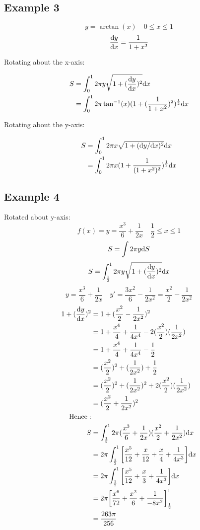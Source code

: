 \documentclass[letterpaper, 12pt]{math}
\begin{document}
\subsection*{Example 3}
\[ y = \arctan(x) \quad 0 \leq x \leq 1 \]
\[ \frac{\mathrm{d}{y}}{\mathrm{d}{x}} = \frac{1}{1+x^{2}} \]
\begin{center}
  Rotating about the x-axis:
\end{center}
\begin{align*}
  S &= \int_{0}^{1}{2\pi y\sqrt{1+(\frac{\mathrm{d}{y}}{\mathrm{d}{x}})^{2}}\mathrm{d}{x}} \\
  &= \int_{0}^{1}{
    2\pi\tan^{-1}(x)(1+(\frac{1}{1+x^{2}})^{2})^{\frac{1}{2}}\mathrm{d}{x}} \\
\end{align*}
\begin{center}
  Rotating about the y-axis:
\end{center}
\begin{align*}
  S &= \int_{0}^{1}{2\pi x\sqrt{1+(\mathrm{d}{y}/\mathrm{d}{x})^{2}}\mathrm{d}{x}} \\
  &= \int_{0}^{1}{2\pi x(1+\frac{1}{(1+x^{2})^{2}})^{\frac{1}{2}}\mathrm{d}{x}}
\end{align*}

\subsection*{Example 4}
Rotated about y-axis:
\[ f(x) = y = \frac{x^{3}}{6}+\frac{1}{2x} \quad \frac{1}{2} \leq x \leq 1 \]
\[ S = \int{2\pi y\mathrm{d}{S}} \]
\[ S = \int_{\frac{1}{2}}^{1}{2\pi
  y\sqrt{1+(\frac{\mathrm{d}{y}}{\mathrm{d}{x}})^{2}}\mathrm{d}{x}} \]
\[ y = \frac{x^{3}}{6}+\frac{1}{2x} \quad
   y' = \frac{3x^{2}}{6}-\frac{1}{2x^{2}} = \frac{x^{2}}{2}-\frac{1}{2x^{2}} \]
\begin{align*}
  1+(\frac{\mathrm{d}{y}}{\mathrm{d}{x}})^{2} &=
    1+(\frac{x^{2}}{2}-\frac{1}{2x^{2}})^{2} \\
  &= 1+\frac{x^{4}}{4}+\frac{1}{4x^{4}}-2(\frac{x^{2}}{2})(\frac{1}{2x^{2}}) \\
  &= 1+\frac{x^{4}}{4}+\frac{1}{4x^{4}}-\frac{1}{2} \\
  &= (\frac{x^{2}}{2})^{2}+(\frac{1}{2x^{2}})+\frac{1}{2} \\
  &= (\frac{x^{2}}{2})^{2}+(\frac{1}{2x^{2}})^{2}+
    2(\frac{x^{2}}{2})(\frac{1}{2x^{2}}) \\
  &= (\frac{x^{2}}{2}+\frac{1}{2x^{2}})^{2} \\
  \mathrm{Hence:} \\
  S &= \int_{\frac{1}{2}}^{1}{2\pi(\frac{x^{3}}{6}+\frac{1}{2x})
    (\frac{x^{2}}{2}+\frac{1}{2x^{2}})\mathrm{d}{x}} \\
  &= 2\pi\int_{\frac{1}{2}}^{1}{
    \bigg[\frac{x^{5}}{12}+\frac{x}{12}+
      \frac{x}{4}+\frac{1}{4x^{3}}\bigg]\mathrm{d}{x}} \\
  &= 2\pi\int_{\frac{1}{2}}^{1}{
    \bigg[\frac{x^{5}}{12}+\frac{x}{3}+\frac{1}{4x^{3}}\bigg]\mathrm{d}{x}} \\
  &= 2\pi\bigg[\frac{x^{6}}{72}+\frac{x^{2}}{6}+
    \frac{1}{-8x^{2}}\bigg]_{\frac{1}{2}}^{1} \\
  &= \frac{263\pi}{256}
\end{align*}
\end{document}
